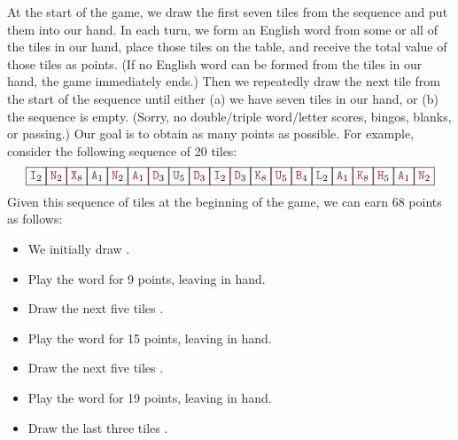 \begin{enumerate}[label=\arabic*.,ref=\thechapter.\arabic*,leftmargin=*,align=left,widest*=99,itemsep=1.5ex plus 0.5ex]
At the start of the game, we draw the first seven tiles from the sequence and put them into our hand.
In each turn, we form an English word from some or all of the tiles in our hand, place those tiles on the table, and receive the total value of those tiles as points.
(If no English word can be formed from the tiles in our hand, the game immediately ends.)
Then we repeatedly draw the next tile from the start of the sequence until either (a) we have seven tiles in our hand, or (b) the sequence is empty.
(Sorry, no double/triple word/letter scores, bingos, blanks, or passing.)
Our goal is to obtain as many points as possible.
For example, consider the following sequence of 20 tiles:
\[
\mbox{\fbox{\Str{I}$_{2}$}\fbox{\Str{N}$_{2}$}\fbox{\Str{X}$_{8}$}\fbox{\Str{A}$_{1}$}\fbox{\Str{N}$_{2}$}\fbox{\Str{A}$_{1}$}\fbox{\Str{D}$_{3}$}\fbox{\Str{U}$_{5}$}\fbox{\Str{D}$_{3}$}\fbox{\Str{I}$_{2}$}\fbox{\Str{D}$_{3}$}\fbox{\Str{K}$_{8}$}\fbox{\Str{U}$_{5}$}\fbox{\Str{B}$_{4}$}\fbox{\Str{L}$_{2}$}\fbox{\Str{A}$_{1}$}\fbox{\Str{K}$_{8}$}\fbox{\Str{H}$_{5}$}\fbox{\Str{A}$_{1}$}\fbox{\Str{N}$_{2}$}}
\]
Given this sequence of tiles at the beginning of the game, we can earn 68 points as follows:
\begin{itemize}
\item We initially draw .
\item Play the word  for 9 points, leaving  in hand.
\item Draw the next five tiles .
\item Play the word  for 15 points, leaving  in hand.
\item Draw the next five tiles .
\item Play the word  for 19 points, leaving  in hand.
\item Draw the last three tiles .

\end{itemize}
\end{enumerate}
